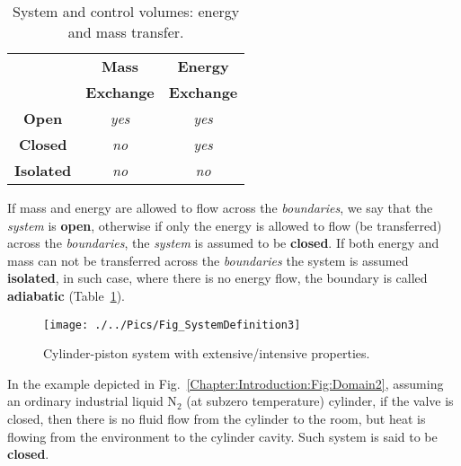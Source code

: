    \begin{table}[h]
     \begin{center}
      \begin{tabular}{|c|c|c|}
         \hline
                      & {\bf Mass} & {\bf Energy} \\
                      & {\bf Exchange} & {\bf Exchange} \\
         \hline
         {\bf Open}   & {\it yes}  & {\it yes}    \\
         {\bf Closed} & {\it no}   & {\it yes}    \\
         {\bf Isolated}&{\it no}   & {\it no}     \\
         \hline 
      \end{tabular}  
        \caption{System and control volumes: energy and mass transfer.}\label{Chapter:Introduction:Table:System}
     \end{center}
   \end{table}
   
   If mass and energy are allowed to flow across the {\it boundaries}, we say that the {\it system} is {\bf open}, otherwise if only the energy is allowed to flow (\ie be transferred) across the {\it boundaries}, the {\it system} is assumed to be {\bf closed}. If both energy and mass can not be transferred across the {\it boundaries} the system is assumed {\bf isolated}, in such case, where there is no energy flow, the boundary is called {\bf adiabatic} (Table~\ref{Chapter:Introduction:Table:System}).

   \begin{figure}[h]
     \begin{center}
        \texttt{[image: ./../Pics/Fig\_SystemDefinition3]}
        \caption{Cylinder-piston system with extensive/intensive properties.}\label{Chapter:Introduction:Fig:Domain3}
     \end{center}
   \end{figure}

   In the example depicted in Fig.~\ref{Chapter:Introduction:Fig:Domain2}, assuming an ordinary industrial liquid N$_{2}$ (at subzero temperature) cylinder, if the valve is closed, then there is no fluid flow from the cylinder to the room, but heat is flowing from the environment to the cylinder cavity. Such system is said to be {\bf closed}.
   
